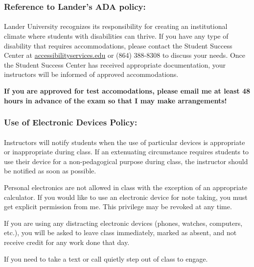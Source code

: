 \documentclass{article}
\begin{document}
    \begin{samepage}
      \subsubsection*{Reference to Lander’s ADA policy:}
      \paragraph*{}
  Lander University recognizes its responsibility for creating an institutional climate where students with disabilities can thrive.
  If you have any type of disability that requires accommodations, please contact the Student Success Center at \href{mailto:accessibilityservices@lander.edu}{accessibilityservices\allowbreak@lander.edu} or (864) 388-8308 to discuss your needs.
  Once the Student Success Center has received appropriate documentation, your instructors will be informed of approved accommodations.

  \textbf{If you are approved for test accomodations, please email me at least 48 hours in advance of the exam so that I may make arrangements!}

    \end{samepage}

    \begin{samepage}
      \subsubsection*{Use of Electronic Devices Policy:} \paragraph*{}
  Instructors will notify students when the use of particular devices is appropriate or inappropriate during class.
  If an extenuating circumstance requires students to use their device for a non-pedagogical purpose during class, the instructor should be notified as soon as possible.

  Personal electronics are not allowed in class with the exception of an appropriate calculator.
  If you would like to use an electronic device for note taking, you must get explicit permission from me.
  This privilege may be revoked at any time.

  If you are using any distracting electronic devices (phones, watches, computers, etc.), you will be asked to leave class immediately, marked as absent, and not receive credit for any work done that day.

  If you need to take a text or call quietly step out of class to engage.

    \end{samepage}
\end{document}
